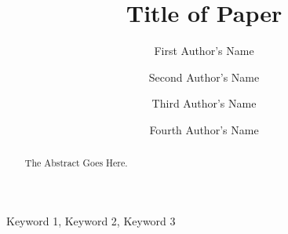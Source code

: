 \begin{frontmatter}


\title{Title of Paper}

\begin{abstract}
    The Abstract Goes Here. \blindtext
\end{abstract}
\begin{keyword}
    Keyword 1\sep
    Keyword 2\sep
    Keyword 3
\end{keyword}

\author[1]{First Author's Name}

\author[1]{Second Author's Name}

\author[2]{Third Author's Name}

\author[3]{Fourth Author's Name}

\address[1]{Department 1, University 1, City 1, Country 1}
\address[2]{Department 2, University 2, City 2, Country 2}
\address[3]{Department 3, University 3, City 3, Country 3}



\end{frontmatter}